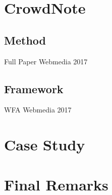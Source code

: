\documentclass[sigconf]{acmart}
\begin{document}
\section{CrowdNote}

\subsection{Method} 
	Full Paper Webmedia 2017 \cite{172450}
	

\subsection{Framework}
	WFA Webmedia 2017 \cite{175831}
	

\section{Case Study}
	


\section{Final Remarks}
	

\begin{acks}
	
\end{acks}



 
\end{document}
